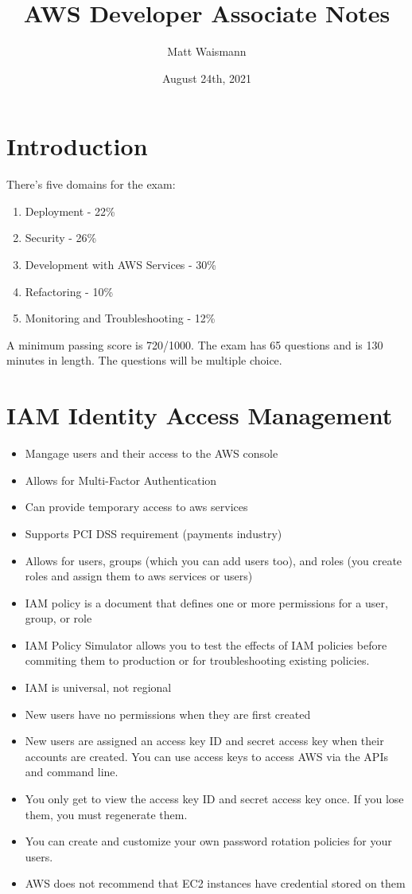 \documentclass{article}%
\title{AWS Developer Associate Notes}
\date{August 24th, 2021}
\author{Matt Waismann}
\begin{document}
\maketitle
\section{Introduction}
There's five domains for the exam:
\begin{enumerate}
    \item Deployment - 22\%
    \item Security - 26\%
    \item Development with AWS Services - 30\%
    \item Refactoring - 10\%
    \item Monitoring and Troubleshooting - 12\%
\end{enumerate}

A minimum passing score is 720/1000. The exam has 65 questions and is 130 minutes in length. The questions will be multiple choice.

\section{IAM Identity Access Management}
\begin{itemize}
    \item Mangage users and their access to the AWS console
    \item Allows for Multi-Factor Authentication
    \item Can provide temporary access to aws services
    \item Supports PCI DSS requirement (payments industry)
    \item Allows for users, groups (which you can add users too), and roles (you create roles and assign them to aws services or users)
    \item IAM policy is a document that defines one or more permissions for a user, group, or role 
    \item IAM Policy Simulator allows you to test the effects of IAM policies before commiting them to production or for troubleshooting existing policies.
    \item IAM is universal, not regional
    \item New users have no permissions when they are first created
    \item New users are assigned an access key ID and secret access key when their accounts are created. You can use access keys to access AWS via the APIs and command line.
    \item You only get to view the access key ID and secret access key once. If you lose them, you must regenerate them. 
    \item You can create and customize your own password rotation policies for your users.
    \item AWS does not recommend that EC2 instances have credential stored on them
\end{itemize}
\end{document}
